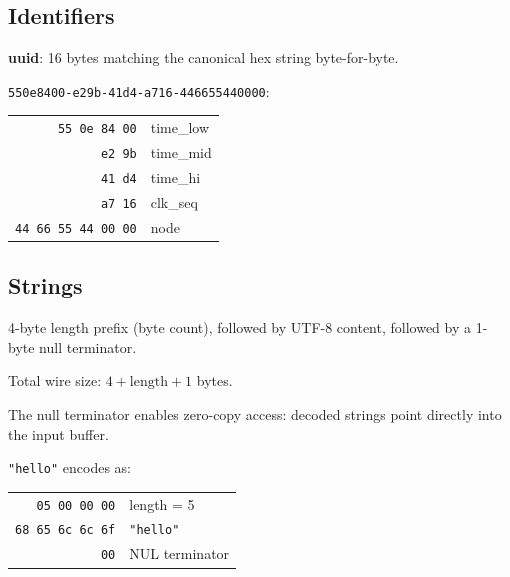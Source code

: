 \documentclass[11pt,onecolumn]{article}
\begin{document}
\subsection{Identifiers}

\begin{minipage}[t]{0.48\textwidth}
\textbf{uuid}: 16 bytes matching the canonical hex string byte-for-byte.
\end{minipage}\hfill
\begin{minipage}[t]{0.48\textwidth}
\small
\texttt{550e8400-e29b-41d4-a716-446655440000}:
\vspace{4pt}

\begin{tabular}[t]{@{}r@{ }l@{}}
\texttt{55 0e 84 00} & time\_low \\
\texttt{e2 9b} & time\_mid \\
\texttt{41 d4} & time\_hi \\
\texttt{a7 16} & clk\_seq \\
\texttt{44 66 55 44 00 00} & node \\
\end{tabular}
\end{minipage}

\subsection{Strings}

\begin{minipage}[t]{0.48\textwidth}
4-byte length prefix (byte count), followed by UTF-8 content, followed by a 1-byte null terminator.

\vspace{6pt}
Total wire size: $4 + \text{length} + 1$ bytes.

\vspace{6pt}
The null terminator enables zero-copy access: decoded strings point directly into the input buffer.
\end{minipage}\hfill
\begin{minipage}[t]{0.48\textwidth}
\small
\texttt{"hello"} encodes as:
\vspace{4pt}

\begin{tabular}[t]{@{}r@{\quad}l@{}}
\texttt{05 00 00 00} & length = 5 \\
\texttt{68 65 6c 6c 6f} & \texttt{"hello"} \\
\texttt{00} & NUL terminator \\
\end{tabular}
\end{minipage}
\end{document}
